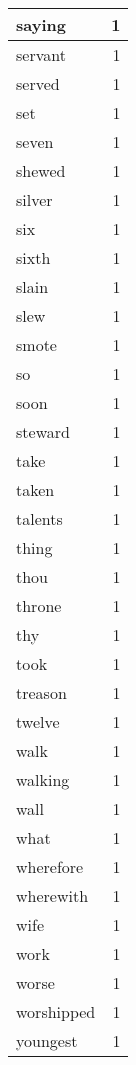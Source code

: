 \begin{center}
\begin{longtable}{l|r}
saying & 1 \\ \hline
servant & 1 \\ \hline
served & 1 \\ \hline
set & 1 \\ \hline
seven & 1 \\ \hline
shewed & 1 \\ \hline
silver & 1 \\ \hline
six & 1 \\ \hline
sixth & 1 \\ \hline
slain & 1 \\ \hline
slew & 1 \\ \hline
smote & 1 \\ \hline
so & 1 \\ \hline
soon & 1 \\ \hline
steward & 1 \\ \hline
take & 1 \\ \hline
taken & 1 \\ \hline
talents & 1 \\ \hline
thing & 1 \\ \hline
thou & 1 \\ \hline
throne & 1 \\ \hline
thy & 1 \\ \hline
took & 1 \\ \hline
treason & 1 \\ \hline
twelve & 1 \\ \hline
walk & 1 \\ \hline
walking & 1 \\ \hline
wall & 1 \\ \hline
what & 1 \\ \hline
wherefore & 1 \\ \hline
wherewith & 1 \\ \hline
wife & 1 \\ \hline
work & 1 \\ \hline
worse & 1 \\ \hline
worshipped & 1 \\ \hline
youngest & 1 \\ \hline
\end{longtable}
\end{center}



\normalsize



 

